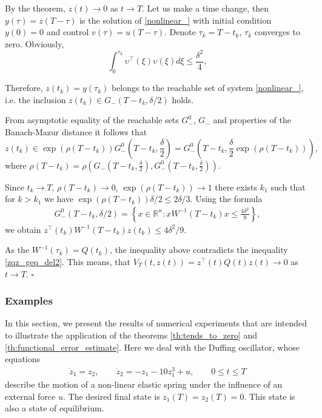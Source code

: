 \documentclass[../main.tex]{subfiles}
\begin{document}
    By the theorem, $z(t) \to 0 $ as $t \to T$. Let us make a time change, then $y(\tau)=z(T-\tau)$ is the solution of \eqref{nonlinear_} with initial condition $y(0)=0$ and control $ v(\tau)=u(T-\tau)$. Denote $\tau_k = T - t_k$, $\tau_k $ converges to zero. Obviously, 
    $$\int_{0}^{\tau_k} \upsilon^{\top}(\xi)\upsilon(\xi) 
	d\xi \leqslant \frac{\delta^2}{4}, $$
    
      Therefore, $z(t_k) = y(\tau_k) $ belongs to the reachable set of system \eqref{nonlinear_}, i.e. the inclusion $z(t_k) \in G_{-}(T-t_k,\delta/2)$ holds.
 
 
    From asymptotic equality of the reachable sets $G_{-}^0$, $ G_{-}$ \cite{GusOsSteklov} and properties of the  Banach-Mazur distance it  follows  that $$z(t_k) \in \exp(\rho(T-t_k))G_{-}^0(T-t_k,\frac{\delta}{2})=G_{-}^0(T-t_k,\frac{\delta}{2}\exp(\rho(T-t_k)))  , $$ where $\rho(T-t_k)=\rho(G_{-}(T-t_k,\frac{\delta}{2}),G_{-}^0(T-t_k,\frac{\delta}{2}))$.

 Since $t_k \to T$, $\rho(T-t_k) \to 0$, $\exp(\rho(T-t_k)) \to 1$ there exists $k_1$  such that for $k > k_1$ we have $\exp(\rho(T-t_k))\delta/2 \leqslant 2\delta/3$. 
Using the formula
\begin{gather*}
G_{-}^0(T-t_k, \delta/2)=\left\{x \in \mathbb{R}^n: x W^{-1}(T-t_k) x \leqslant \frac{4\delta^2}{9} \right\},	
\end{gather*}
we obtain $ z^{\top}(t_k) W^{-1}(T-t_k) z(t_k) \leqslant 4\delta^2/9$.

 As the $ W^{-1}(\tau_k) = Q(t_k)$, the inequality above contradicts the inequality \eqref{zqz_geq_del2}. This means, that $V_{T}(t,z(t))  =z^{\top}(t)Q(t)z(t) \to 0$  as $t \to T$.
	\hfill $ \square $

\subsubsection{Examples}


In this section, we  present the results of numerical experiments that are intended to illustrate the application of the theorems \ref{th:tends_to_zero} and \ref{th:functional_error_estimate}. Here we deal with the Duffing oscillator, whose equations
\begin{gather}\label{Duffing}
    \dot{z}_1 = z_2, \qquad \dot{z}_2 = -z_1 - 10z_1^3 + u,\qquad 0\leqslant t 
    \leqslant T
\end{gather}
describe the motion of a non-linear elastic spring under the influence of an external force $u$. The desired final state is $z_1(T) = z_2(T) = 0$. This state is also a state of equilibrium. 
\end{document}
